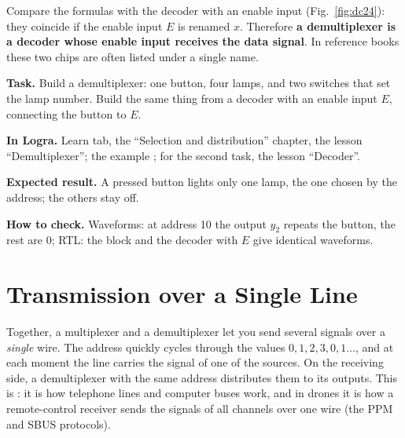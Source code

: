 Compare the formulas with the decoder with an enable input
(Fig.~\ref{fig:dc24}): they coincide if the enable input $E$ is renamed $x$.
Therefore \textbf{a demultiplexer is a decoder whose enable input receives the
data signal}. In reference books these two chips are often listed under a single
name.

\begin{diybox}
\textbf{Task.}  Build a demultiplexer: one button, four lamps, and two
switches that set the lamp number.  Build the same thing from a decoder
with an enable input $E$, connecting the button to $E$.

\textbf{In Logra.} Learn tab, the ``Selection and distribution'' chapter, the
lesson ``Demultiplexer''; the example ; for the second task,
the lesson ``Decoder''.

\textbf{Expected result.} A pressed button lights only one lamp, the one chosen
by the address; the others stay off.

\textbf{How to check.} Waveforms: at address 10 the output $y_2$ repeats the
button, the rest are 0; RTL: the block and the decoder with $E$ give identical
waveforms.
\end{diybox}

\section{Transmission over a Single Line}

Together, a multiplexer and a demultiplexer let you send several signals over a
\emph{single} wire. The address quickly cycles through the values $0, 1, 2, 3, 0,
1\ldots$, and at each moment the line carries the signal of one of the sources.
On the receiving side, a demultiplexer with the same address distributes them to
its outputs. This is : it is how telephone
lines and computer buses work, and in drones it is how a remote-control receiver
sends the signals of all channels over one wire (the PPM and SBUS protocols).

